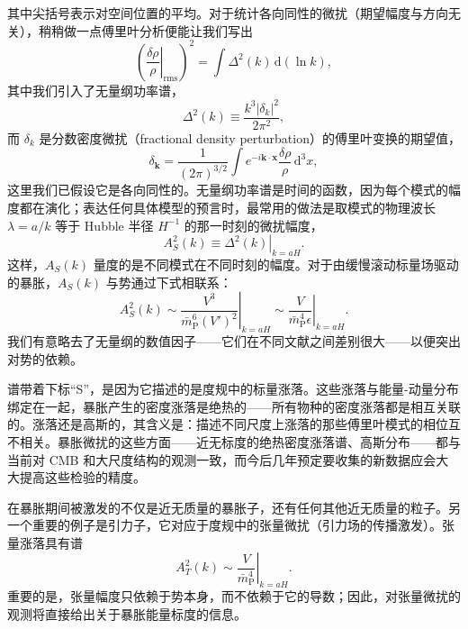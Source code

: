 其中尖括号表示对空间位置的平均。对于统计各向同性的微扰（期望幅度与方向无关），稍稍做一点傅里叶分析便能让我们写出
\begin{equation*}
\left(\left.\frac{\delta\rho}{\rho}\right|_{\mathrm{rms}}\right)^{2} = \int \Delta^{2}(k)\,\mathrm{d}(\ln k),
\tag{8.201}
\end{equation*}
其中我们引入了无量纲功率谱，
\begin{equation*}
\Delta^{2}(k) \equiv \frac{k^{3}|\delta_{k}|^{2}}{2\pi^{2}},
\tag{8.202}
\end{equation*}
而 $\delta_{k}$ 是分数密度微扰（fractional density perturbation）的傅里叶变换的期望值，
\begin{equation*}
\delta_{\mathbf{k}} = \frac{1}{(2\pi)^{3/2}}\int e^{-i\mathbf{k}\cdot\mathbf{x}}\frac{\delta\rho}{\rho}\,\mathrm{d}^{3}x,
\tag{8.203}
\end{equation*}
这里我们已假设它是各向同性的。无量纲功率谱是时间的函数，因为每个模式的幅度都在演化；表达任何具体模型的预言时，最常用的做法是取模式的物理波长 $\lambda=a/k$ 等于 Hubble 半径 $H^{-1}$ 的那一时刻的微扰幅度，
\begin{equation*}
A_{S}^{2}(k) \equiv \left.\Delta^{2}(k)\right|_{k=aH}.
\tag{8.204}
\end{equation*}
这样，$A_{S}(k)$ 量度的是不同模式在不同时刻的幅度。对于由缓慢滚动标量场驱动的暴胀，$A_{S}(k)$ 与势通过下式相联系：
\begin{equation*}
A_{S}^{2}(k) \sim \left.\frac{V^{3}}{\bar{m}_{\mathrm{P}}^{6}(V')^{2}}\right|_{k=aH} \sim \left.\frac{V}{\bar{m}_{\mathrm{P}}^{4}\epsilon}\right|_{k=aH}.
\tag{8.205}
\end{equation*}
我们有意略去了无量纲的数值因子——它们在不同文献之间差别很大——以便突出对势的依赖。

谱带着下标“S”，是因为它描述的是度规中的标量涨落。这些涨落与能量-动量分布绑定在一起，暴胀产生的密度涨落是绝热的——所有物种的密度涨落都是相互关联的。涨落还是高斯的，其含义是：描述不同尺度上涨落的那些傅里叶模式的相位互不相关。暴胀微扰的这些方面——近无标度的绝热密度涨落谱、高斯分布——都与当前对 CMB 和大尺度结构的观测一致，而今后几年预定要收集的新数据应会大大提高这些检验的精度。

在暴胀期间被激发的不仅是近无质量的暴胀子，还有任何其他近无质量的粒子。另一个重要的例子是引力子，它对应于度规中的张量微扰（引力场的传播激发）。张量涨落具有谱
\begin{equation*}
A_{T}^{2}(k) \sim \left.\frac{V}{\bar{m}_{\mathrm{P}}^{4}}\right|_{k=aH}.
\tag{8.206}
\end{equation*}
重要的是，张量幅度只依赖于势本身，而不依赖于它的导数；因此，对张量微扰的观测将直接给出关于暴胀能量标度的信息。

